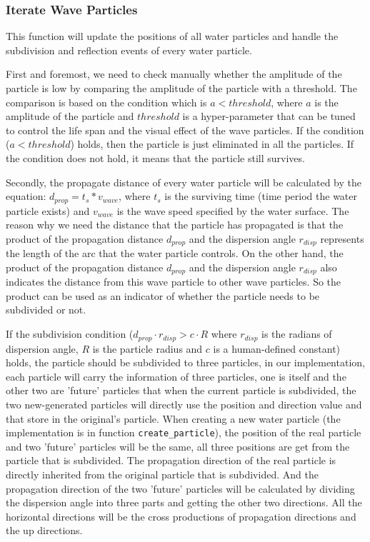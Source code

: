 \documentclass[acmtog]{acmart}
\begin{document}
\subsubsection{Iterate Wave Particles}
This function will update the positions of all water particles and handle the subdivision and reflection events of every water particle.

First and foremost, we need to check manually whether the amplitude of the particle is low by comparing the amplitude of the particle with a threshold. 
The comparison is based on the condition which is $a < threshold$, where $a$ is the amplitude of the particle and $threshold$ is a hyper-parameter that can be tuned to control the life span and the visual effect of the wave particles. 
If the condition ($a < threshold$) holds, then the particle is just eliminated in all the particles. 
If the condition does not hold, it means that the particle still survives. 


Secondly, the propagate distance of every water particle will be calculated by the equation: $d_{prop} = t_{s} * v_{wave}$, where $t_{s}$ is the surviving time (time period the water particle exists) and $v_{wave}$ is the wave speed specified by the water surface. 
The reason why we need the distance that the particle has propagated is that the product of the propagation distance $d_{prop}$ and the dispersion angle $r_{disp}$ represents the length of the arc that the water particle controls. 
On the other hand, the product of the propagation distance $d_{prop}$ and the dispersion angle $r_{disp}$ also indicates the distance from this wave particle to other wave particles. 
So the product can be used as an indicator of whether the particle needs to be subdivided or not. 

If the subdivision condition ($d_{prop}\cdot r_{disp} > c \cdot R$ where $r_{disp}$ is the radians of dispersion angle, $R$ is the particle radius and $c$ is a human-defined constant) holds, the particle should be subdivided to three particles, in our implementation, each particle will carry the information of three particles, one is itself and the other two are 'future' particles that when the current particle is subdivided, the two new-generated particles will directly use the position and direction value and that store in the original's particle. 
When creating a new water particle (the implementation is in function \verb|create_particle|), the position of the real particle and two 'future' particles will be the same, all three positions are get from the particle that is subdivided. 
The propagation direction of the real particle is directly inherited from the original particle that is subdivided. 
And the propagation direction of the two 'future' particles will be calculated by dividing the dispersion angle into three parts and getting the other two directions. 
All the horizontal directions will be the cross productions of propagation directions and the up directions.
\end{document}
